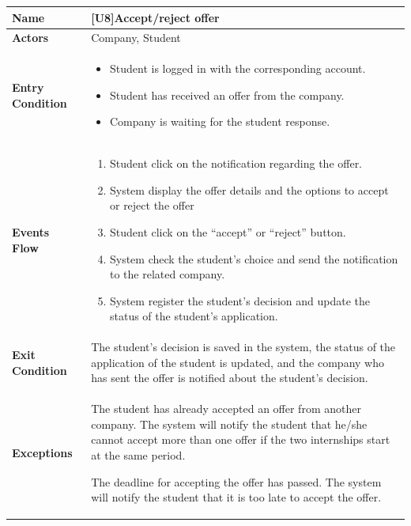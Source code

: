 \begin{center}
    \begin{tabular}{|p{9em}|p{27em}|}
        \hline
        \rowcolor{bluepoli!40} %
        \textbf{Name} & \textbf{[U8]Accept/reject offer} \\
        \hline
        \textbf{Actors} & Company, Student\\
        \hline
        \textbf{Entry Condition} & 
        \begin{itemize}
            \item Student is logged in with the corresponding account.
            \item Student has received an offer from the company.
            \item Company is waiting for the student response.
        \end{itemize} \\
        \hline
        \textbf{Events Flow} & 
        \begin{enumerate}
            \item Student click on the notification regarding the offer.
            \item System display the offer details and the options to accept or reject the offer
            \item Student click on the ``accept'' or ``reject'' button.
            \item System check the student's choice and send the notification to the related company.
            \item System register the student's decision and update the status of the student's application.
        \end{enumerate} \\
        \hline
        \textbf{Exit Condition} & 
         The student's decision is saved in the system, the status of the application of the student is updated, and the company
         who has sent the offer is notified about the student's decision.\\
        \hline
        \textbf{Exceptions} &
        The student has already accepted an offer from another company. The system will notify the student that he/she cannot accept
        more than one offer if the two internships start at the same period.

        The deadline for accepting the offer has passed. The system will notify the student that it is too late to accept the offer.\\
        \hline
    \end{tabular}
\end{center}

